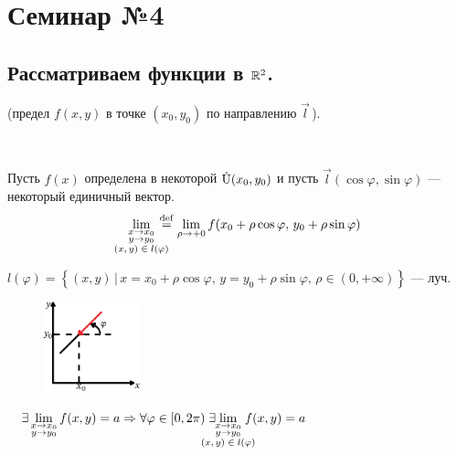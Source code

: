 \newcommand{\coursename}{Математический анализ 1 к. 2 с.}
\newcommand{\compiledby}{} %
\newcommand{\coursedate}{Весна 2018 г.}



\section{Семинар №4}

\subsection{Рассматриваем функции в $\R^2$.}

\Def (предел $f(x,y)$ в точке $(x_0, y_0)$ по направлению $\vec l \,$).

~~\parbox[t]{0.95\linewidth} {
Пусть $f(x)$ определена в некоторой $\Uo(x_0, y_0)$ и пусть $\vec l (\cos\varphi, \sin\varphi)$ --- некоторый единичный вектор.
$$\lim\limits_{\substack {x \to x_0 \\ y \to y_0 \\ \normalsize \text{$(x,y)  \in  l(\varphi)$}}} \! \! \! \! \! \! \eqdef \lim\limits_{\rho \to +0} f(x_0 + \rho\cos\varphi,\, y_0 + \rho\sin\varphi) $$
}

\Note $l(\varphi) = \left\{ (x,y) \, | \, x=x_0 + \rho\cos\varphi,\, y=y_0 + \rho\sin\varphi, \, \rho \in (0, +\infty) \right\}$ --- луч.

\begin{figure}[h]
	\begin{center}
	    \includegraphics[width=0.25\textwidth]{1.png}
	  \end{center}
	\caption{}
\end{figure}


~~$\exists \lim\limits_{\substack {x \to x_0 \\ y \to y_0}} f(x,y) = a \Rightarrow \forall \varphi \in [0, 2\pi) \; \exists \! \! \! \! \! \! \! \! \lim\limits_{\substack {x \to x_0 \\ y \to y_0 \\ \normalsize \text{$(x,y)  \in  l(\varphi)$}}} \! \! \! \! \! \! f(x,y) = a$

